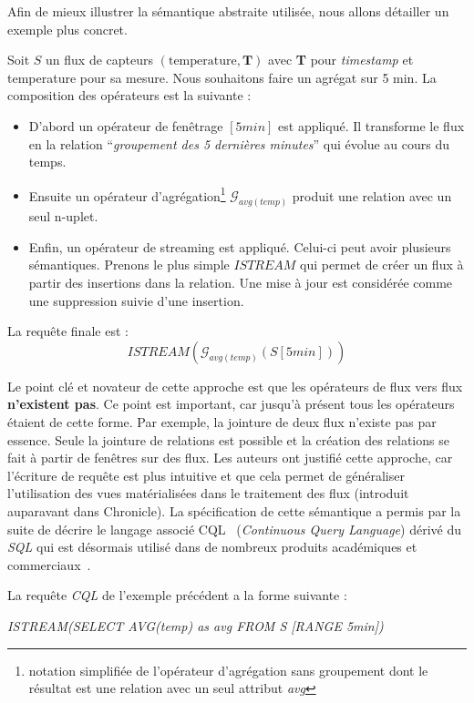 Afin de mieux illustrer la sémantique abstraite utilisée, nous allons détailler un exemple plus concret.
\begin{example}
Soit $S$ un flux de capteurs $(\mathrm{temperature}, \textbf{T})$ avec \textbf{T} pour \textit{timestamp} et temperature pour sa mesure. Nous souhaitons faire un agrégat sur 5 min. La composition des opérateurs est la suivante :
\begin{itemize}
\item D'abord un opérateur de fenêtrage $[5min]$ est appliqué. Il transforme le flux en la relation \enquote{\it groupement des 5 dernières minutes} qui évolue au cours du temps.
\item Ensuite un opérateur d'agrégation\footnote{notation simplifiée de l'opérateur d'agrégation sans groupement dont le résultat est une relation avec un seul attribut \textit{avg}} $\mathcal G_{avg(temp)}$ produit une relation avec un seul n-uplet.
\item Enfin, un opérateur de \textup{streaming} est appliqué. Celui-ci peut avoir plusieurs sémantiques. Prenons le plus simple $ISTREAM$ qui permet de créer un flux à partir des insertions dans la relation. Une mise à jour est considérée comme une suppression suivie d'une insertion.
\end{itemize}
La requête finale est : $$ISTREAM(\mathcal G_{avg(temp)}(S[5min]))$$
\end{example}

Le point clé et novateur de cette approche est que les opérateurs de flux vers flux \textbf{n'existent pas}. Ce point est important, car jusqu'à présent tous les opérateurs étaient de cette forme. Par exemple, la jointure de deux flux n'existe pas par essence. Seule la jointure de relations est possible et la création des relations se fait à partir de fenêtres sur des flux. Les auteurs ont justifié cette approche, car l'écriture de requête est plus intuitive et que cela permet de généraliser l'utilisation des vues matérialisées dans le traitement des flux (introduit auparavant dans Chronicle). La spécification de cette sémantique a permis par la suite de décrire le langage associé CQL~\cite{Arasu:cql} (\textit{Continuous Query Language}) dérivé du \textit{SQL} qui est désormais utilisé dans de nombreux produits académiques et commerciaux~\cite{Witkowski:oraclecq,url:sqlstream}.

\begin{example}
La requête \textit{CQL} de l'exemple précédent a la forme suivante : 
\begin{center}
\it ISTREAM(SELECT AVG(temp) as avg FROM S [RANGE 5min])
\end{center}
\end{example}

